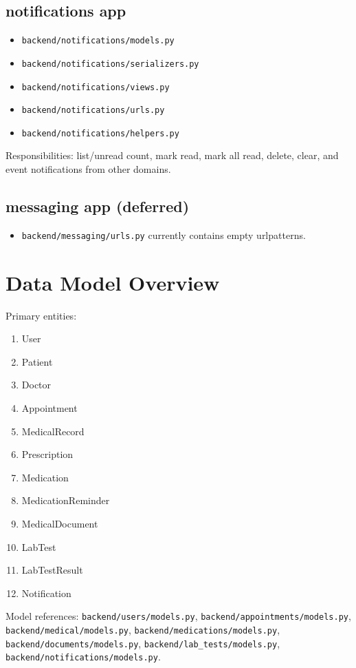 \documentclass[12pt,a4paper]{article}
\begin{document}
\subsection{notifications app}
\begin{itemize}
  \item \texttt{backend/notifications/models.py}
  \item \texttt{backend/notifications/serializers.py}
  \item \texttt{backend/notifications/views.py}
  \item \texttt{backend/notifications/urls.py}
  \item \texttt{backend/notifications/helpers.py}
\end{itemize}
Responsibilities: list/unread count, mark read, mark all read, delete, clear, and event notifications from other domains.

\subsection{messaging app (deferred)}
\begin{itemize}
  \item \texttt{backend/messaging/urls.py} currently contains empty urlpatterns.
\end{itemize}

\section{Data Model Overview}

Primary entities:
\begin{enumerate}
  \item User
  \item Patient
  \item Doctor
  \item Appointment
  \item MedicalRecord
  \item Prescription
  \item Medication
  \item MedicationReminder
  \item MedicalDocument
  \item LabTest
  \item LabTestResult
  \item Notification
\end{enumerate}

Model references:
\texttt{backend/users/models.py},
\texttt{backend/appointments/models.py},
\texttt{backend/medical/models.py},
\texttt{backend/medications/models.py},
\texttt{backend/documents/models.py},
\texttt{backend/lab\_tests/models.py},
\texttt{backend/notifications/models.py}.
\end{document}
